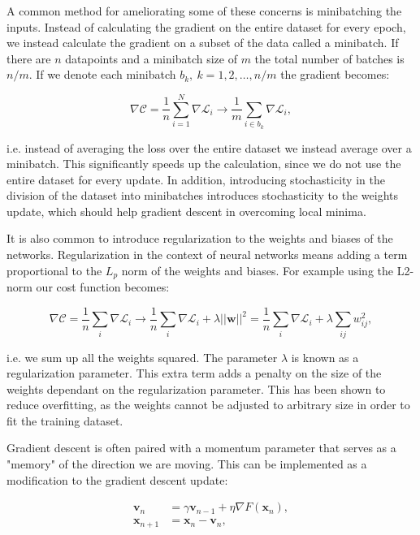 A common method for ameliorating some of these concerns
is minibatching the inputs. Instead of calculating
the gradient on the entire dataset for every epoch,
we instead calculate the gradient on a subset
of the data called a minibatch.
If there are $n$ datapoints and a minibatch size
of $m$ the total number of batches is $n/m$.
If we denote each minibatch $b_k, \ k=1,2,\dots,n/m$
the gradient becomes:

$$ \nabla \mathcal{C} = \frac{1}{n} \sum_{i=1}^N
    \nabla \mathcal{L}_i \rightarrow
    \frac{1}{m} \sum_{i \in b_k} \nabla \mathcal{L}_i , $$

i.e. instead of averaging the loss over the entire dataset
we instead average over a minibatch.
This significantly speeds up the calculation, since
we do not use the entire dataset for every update.
In addition, introducing stochasticity in the
division of the dataset into minibatches introduces stochasticity
to the weights update, which should help gradient descent
in overcoming local minima.
\par
It is also common to introduce regularization to the weights
and biases of the networks. Regularization in the context
of neural networks means adding a term proportional
to the $L_p$ norm of the weights and biases.
For example using the L2-norm our cost function becomes:

$$ \nabla \mathcal{C} = \frac{1}{n} \sum_i \nabla \mathcal{L}_i
    \rightarrow \frac{1}{n} \sum_i \nabla \mathcal{L}_i
    + \lambda \left| \left| \bm{w} \right| \right|^2
    = \frac{1}{n} \sum_i \nabla \mathcal{L}_i
    + \lambda \sum_{ij} w_{ij}^2 , $$

i.e. we sum up all the weights squared.
The parameter $\lambda$ is known as a regularization parameter.
This extra term adds a penalty on the size of the weights
dependant on the regularization parameter. This has
been shown to reduce overfitting, as the weights
cannot be adjusted to arbitrary size in order
to fit the training dataset.
\par
Gradient descent is often paired with a momentum parameter
that serves as a "memory" of the direction we are moving.
This can be implemented as a modification to the
gradient descent update:

\begin{equation}
    \begin{split}
        \bm{v}_n &= \gamma \bm{v}_{n-1} + \eta \nabla F(\bm{x}_n) , \\
        \bm{x}_{n+1} &= \bm{x}_n - \bm{v}_n ,
    \end{split}
\end{equation}

